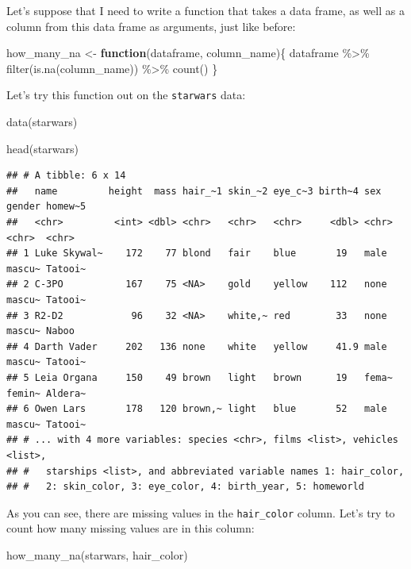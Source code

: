 \documentclass[
]{article}
\newenvironment{Shaded}{\begin{snugshade}}{\end{snugshade}}
\newcommand{\ControlFlowTok}[1]{\textcolor[rgb]{0.13,0.29,0.53}{\textbf{#1}}}
\newcommand{\FunctionTok}[1]{\textcolor[rgb]{0.00,0.00,0.00}{#1}}
\newcommand{\NormalTok}[1]{#1}
\newcommand{\OtherTok}[1]{\textcolor[rgb]{0.56,0.35,0.01}{#1}}
\newcommand{\SpecialCharTok}[1]{\textcolor[rgb]{0.00,0.00,0.00}{#1}}
\begin{document}
Let's suppose that I need to write a function that takes a data frame, as well as a column from
this data frame as arguments, just like before:

\begin{Shaded}
\begin{Highlighting}[]
\NormalTok{how\_many\_na }\OtherTok{\textless{}{-}} \ControlFlowTok{function}\NormalTok{(dataframe, column\_name)\{}
\NormalTok{  dataframe }\SpecialCharTok{\%\textgreater{}\%}
    \FunctionTok{filter}\NormalTok{(}\FunctionTok{is.na}\NormalTok{(column\_name)) }\SpecialCharTok{\%\textgreater{}\%}
    \FunctionTok{count}\NormalTok{()}
\NormalTok{\}}
\end{Highlighting}
\end{Shaded}

Let's try this function out on the \texttt{starwars} data:

\begin{Shaded}
\begin{Highlighting}[]
\FunctionTok{data}\NormalTok{(starwars)}

\FunctionTok{head}\NormalTok{(starwars)}
\end{Highlighting}
\end{Shaded}

\begin{verbatim}
## # A tibble: 6 x 14
##   name         height  mass hair_~1 skin_~2 eye_c~3 birth~4 sex   gender homew~5
##   <chr>         <int> <dbl> <chr>   <chr>   <chr>     <dbl> <chr> <chr>  <chr>  
## 1 Luke Skywal~    172    77 blond   fair    blue       19   male  mascu~ Tatooi~
## 2 C-3PO           167    75 <NA>    gold    yellow    112   none  mascu~ Tatooi~
## 3 R2-D2            96    32 <NA>    white,~ red        33   none  mascu~ Naboo  
## 4 Darth Vader     202   136 none    white   yellow     41.9 male  mascu~ Tatooi~
## 5 Leia Organa     150    49 brown   light   brown      19   fema~ femin~ Aldera~
## 6 Owen Lars       178   120 brown,~ light   blue       52   male  mascu~ Tatooi~
## # ... with 4 more variables: species <chr>, films <list>, vehicles <list>,
## #   starships <list>, and abbreviated variable names 1: hair_color,
## #   2: skin_color, 3: eye_color, 4: birth_year, 5: homeworld
\end{verbatim}

As you can see, there are missing values in the \texttt{hair\_color} column. Let's try to count how many
missing values are in this column:

\begin{Shaded}
\begin{Highlighting}[]
\FunctionTok{how\_many\_na}\NormalTok{(starwars, hair\_color)}
\end{Highlighting}
\end{Shaded}
\end{document}
